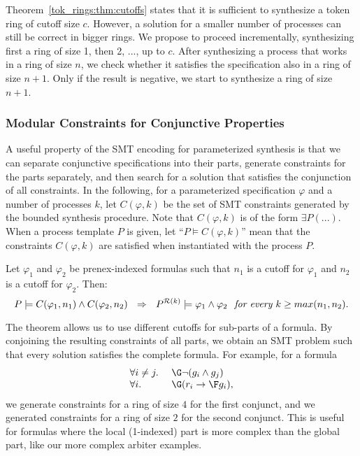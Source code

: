 Theorem~\ref{tok_rings:thm:cutoffs} states that it is sufficient to synthesize a token ring of cutoff size $c$.
However, a solution for a smaller number of processes can still be correct in bigger rings.
We propose to proceed incrementally, synthesizing first a ring of size 1, then 2, ..., up to $c$.
After synthesizing a process that works in a ring of size $n$,
we check whether it satisfies the specification also in a ring of size $n+1$.
Only if the result is negative,
we start to synthesize a ring of size $n+1$.

\subsubsection{Modular Constraints for Conjunctive Properties}

A useful property of the SMT encoding for parameterized synthesis is that
we can separate conjunctive specifications into their parts,
generate constraints for the parts separately,
and then search for a solution that satisfies the conjunction of all constraints.
In the following,
for a parameterized specification $\varphi$ and a number of processes $k$,
let $C(\varphi,k)$ be the set of SMT constraints generated by the bounded synthesis procedure.
Note that $C(\varphi,k)$ is of the form $\exists P (...)$.
When a process template $P$ is given,
let ``$P \models C(\varphi,k)$'' mean that the constraints $C(\varphi,k)$ are satisfied
when instantiated with the process $P$.
\begin{theorem}
Let $\varphi_1$ and $\varphi_2$ be prenex-indexed formulas
such that $n_1$ is a cutoff for $\varphi_1$ and $n_2$ is a cutoff for $\varphi_2$.
Then:
$$
P \models C(\varphi_1,n_1) \land C(\varphi_2,n_2) ~~\Rightarrow~~
P^{\mathcal {R}(k)} \models \varphi_1 \land \varphi_2 \textit{~~for every~} k \geq max(n_1,n_2).
$$
\end{theorem}

The theorem allows us to use different cutoffs for sub-parts of a formula.
By conjoining the resulting constraints of all parts,
we obtain an SMT problem such that every solution satisfies the complete formula.
For example, for a formula
$$
\begin{array}{ll}%
\forall i \neq j.~ & \G \neg ( g_i \land g_j ) \\
\forall i.~ & \G (r_i \impl \F g_i),
\end{array}
$$
we generate constraints for a ring of size $4$ for the first conjunct,
and we generated constraints for a ring of size $2$ for the second conjunct.
This is useful for formulas where the local (1-indexed) part is more complex than the global part,
like our more complex arbiter examples.


